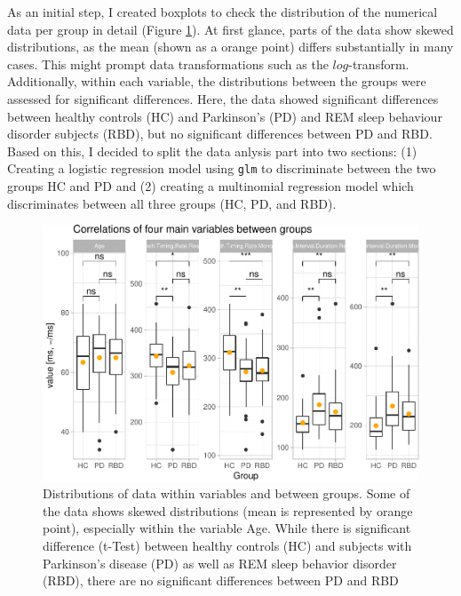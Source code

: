 \documentclass[
  english,
  doc,floatsintext]{apa6}
\begin{document}
As an initial step, I created boxplots to check the distribution of the numerical data per group
in detail (Figure \ref{fig:boxplots-and-correlations}).
At first glance, parts of the data show skewed distributions, as the mean (shown as a orange point)
differs substantially in many cases. This might prompt data transformations such as the \(log\)-transform.
Additionally, within each variable, the distributions between the groups were assessed for significant differences.
Here, the data showed significant differences between healthy controls (HC) and Parkinson's (PD) and REM sleep
behaviour disorder subjects (RBD), but no significant differences between PD and RBD. Based on this, I decided
to split the data anlysis part into two sections: (1) Creating a logistic regression model using \texttt{glm} to
discriminate between the two groups HC and PD and (2) creating a multinomial regression model which discriminates
between all three groups (HC, PD, and RBD).

\begin{figure}

{\centering \includegraphics{dap_report_anja_probst_files/figure-latex/boxplots-and-correlations-1} 

}

\caption{Distributions of data within variables and between groups. Some of the data shows skewed distributions (mean is represented by orange point), especially within the variable Age. While there is significant difference (t-Test) between healthy controls (HC) and subjects with Parkinson's disease (PD) as well as REM sleep behavior disorder (RBD), there are no significant differences between PD and RBD}\label{fig:boxplots-and-correlations}
\end{figure}
\end{document}
